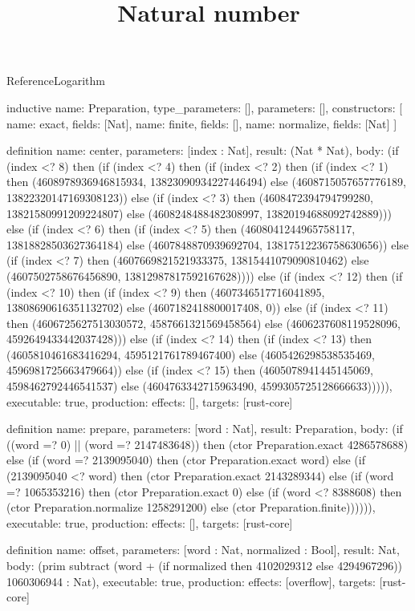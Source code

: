 \begin{lexlean}{ReferenceLogarithm}
\title{Natural number}
\begin{semanticmodule}
inductive{
  name: Preparation,
  type_parameters: [],
  parameters: [],
  constructors: [
    {name: exact, fields: [Nat]},
    {name: finite, fields: []},
    {name: normalize, fields: [Nat]}
  ]
}

definition{
  name: center,
  parameters: [index : Nat],
  result: (Nat * Nat),
  body: (if (index <? 8) then (if (index <? 4) then (if (index <? 2) then (if (index <? 1) then (4608978936946815934, 13823090934227446494) else (4608715057657776189, 13822320147169308123)) else (if (index <? 3) then (4608472394794799280, 13821580991209224807) else (4608248488482308997, 13820194688092742889))) else (if (index <? 6) then (if (index <? 5) then (4608041244965758117, 13818828503627364184) else (4607848870939692704, 13817512236758630656)) else (if (index <? 7) then (4607669821521933375, 13815441079090810462) else (4607502758676456890, 13812987817592167628)))) else (if (index <? 12) then (if (index <? 10) then (if (index <? 9) then (4607346517716041895, 13808690616351132702) else (4607182418800017408, 0)) else (if (index <? 11) then (4606725627513030572, 4587661321569458564) else (4606237608119528096, 4592649433442037428))) else (if (index <? 14) then (if (index <? 13) then (4605810461683416294, 4595121761789467400) else (4605426298538535469, 4596981725663479664)) else (if (index <? 15) then (4605078941445145069, 4598462792446541537) else (4604763342715963490, 4599305725128666633))))),
  executable: true,
  production: {effects: [], targets: [rust-core]}
}

definition{
  name: prepare,
  parameters: [word : Nat],
  result: Preparation,
  body: (if ((word =? 0) || (word =? 2147483648)) then (ctor Preparation.exact 4286578688) else (if (word =? 2139095040) then (ctor Preparation.exact word) else (if (2139095040 <? word) then (ctor Preparation.exact 2143289344) else (if (word =? 1065353216) then (ctor Preparation.exact 0) else (if (word <? 8388608) then (ctor Preparation.normalize 1258291200) else (ctor Preparation.finite)))))),
  executable: true,
  production: {effects: [], targets: [rust-core]}
}

definition{
  name: offset,
  parameters: [word : Nat, normalized : Bool],
  result: Nat,
  body: (prim subtract (word + (if normalized then 4102029312 else 4294967296)) 1060306944 : Nat),
  executable: true,
  production: {effects: [overflow], targets: [rust-core]}
}


\end{semanticmodule}
\end{lexlean}

